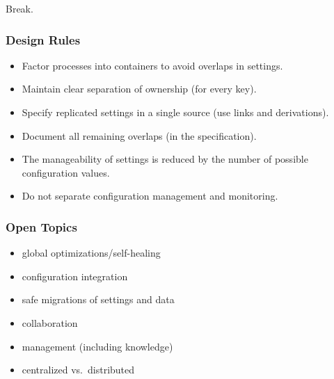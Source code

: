 \begin{assignment}
	\begin{task}
	Break.
	\end{task}
\end{assignment}

\begin{frame}
	\frametitle{Design Rules~\cite{burgess2006modeling}}

	\begin{itemize}[<+-| alert@+>]
	\item Factor processes into containers to avoid overlaps in settings.
	\item Maintain clear separation of ownership (for every key).
	\item Specify replicated settings in a single source (use links and derivations).
	\item Document all remaining overlaps (in the specification).
	\item The manageability of settings is reduced by the number of possible configuration values.
	\item Do not separate configuration management and monitoring.
	\end{itemize}
\end{frame}


\begin{frame}
	\frametitle{Open Topics}

	\begin{itemize}[<+-| alert@+>]
	\item global optimizations/self-healing
	\item configuration integration
	\item safe migrations of settings and data
	\item collaboration
	\item management (including knowledge)
	\item centralized vs.\ distributed
	\end{itemize}
\end{frame}


